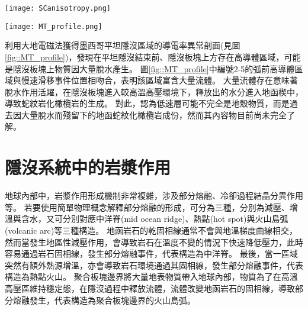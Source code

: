 \begin{figure*}[ht!]
    \centering
    \texttt{[image: SCanisotropy.png]}
    \caption[墨西哥隱沒帶板塊介面附近剪切帶結構示意圖，摘自\citet{Song2012SC}]{墨西哥隱沒帶板塊介面附近剪切帶結構示意圖，摘自\citet{Song2012SC}。大地震主要發生在鎖定區(locked zone)和脆性(brittle)變形區域。慢速滑移事件(slow-slip event)主要發生在過渡帶(transition zone)和半韌性區域(seni-ductile regime)，V$_S$非常低，且非均向性極強。這些低速帶流體導致板塊介面處於弱耦合狀態，並且主導該地區慢速滑移事件的生成。
    }
    \label{fig::SCanisotorpy2012}
\end{figure*}


\begin{figure*}[ht!]
    \centering
    \texttt{[image: MT\_profile.png]}
    \caption[墨西哥平坦隱沒區域的導電率異常剖面圖與解釋圖，摘自\citet{MT2006}]{墨西哥平坦隱沒區域的導電率異常剖面圖與解釋圖，摘自\citet{MT2006}。上圖為電阻率異常結果剖面，所繪之隱沒板塊位置參考自\citet{pardo1995}結果，最上方標示跨墨西哥火山帶的範圍。圖中每個數字圈皆代表隱沒帶上岩石發生脫水的位置，1為黏土礦物的脫水，2為藍片岩相變至綠簾石發生的脫水，3為綠簾石相變至榴輝岩的脫水，4為隱沒板塊上綠泥石的脫水，5為角閃石的脫水。下圖為電阻異常解釋圖，綠色區域為電阻異常低區(<100 $\Omega m$)。在平坦隱沒段結束處有多個岩石相變事件發生，隱沒板塊上出現大範圍導體。
    }
    \label{fig::MT_profile}
\end{figure*}

\citet{MT2006}利用大地電磁法獲得墨西哥平坦隱沒區域的導電率異常剖面(見圖\ref{fig::MT_profile})，發現在平坦隱沒結束前、隱沒板塊上方存在高導體區域，可能是隱沒板塊上物質因大量脫水產生。
圖\ref{fig::MT_profile}中編號2-5的弧前高導體區域與慢速滑移事件位置相吻合，表明該區域富含大量流體。
大量流體存在意味著脫水作用活躍，在隱沒板塊進入較高溫高壓環境下，釋放出的水分進入地函楔中，導致蛇紋岩化橄欖岩的生成。
對此，\citet{Manea2013}認為低速層可能不完全是地殼物質，而是過去因大量脫水而殘留下的地函蛇紋化橄欖岩成份，然而其內容物目前尚未完全了解。

\section{隱沒系統中的岩漿作用}\label{隱沒系統中的岩漿作用}
地球內部中，岩漿作用形成機制非常複雜，涉及部分熔融、冷卻過程結晶分異作用等。
若要使用簡單物理概念解釋部分熔融的形成，可分為三種，分別為減壓、增溫與含水，又可分別對應中洋脊(mid ocean ridge)、熱點(hot spot)與火山島弧(volcanic arc)等三種構造。
地函岩石的乾固相線通常不會與地溫梯度曲線相交，然而當發生地區性減壓作用，會導致岩石在溫度不變的情況下快速降低壓力，此時容易通過岩石固相線，發生部分熔融事件，代表構造為中洋脊。
最後，當一區域突然有額外熱源增溫，亦會導致岩石環境通過其固相線，發生部分熔融事件，代表構造為熱點火山。
聚合板塊邊界將大量地表物質帶入地球內部，物質為了在高溫高壓區維持穩定態，在隱沒過程中釋放流體，流體改變地函岩石的固相線，導致部分熔融發生，代表構造為聚合板塊邊界的火山島弧。

